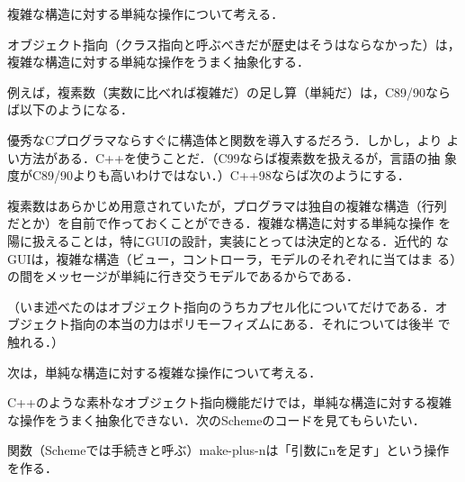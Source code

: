 \documentclass[a5paper,twoside,fleqn,draft]{jsbook}
\begin{document}

複雑な構造に対する単純な操作について考える．

オブジェクト指向（クラス指向と呼ぶべきだが歴史はそうはならなかった）は，
複雑な構造に対する単純な操作をうまく抽象化する．

例えば，複素数（実数に比べれば複雑だ）の足し算（単純だ）は，C89/90なら
ば以下のようになる．


優秀なCプログラマならすぐに構造体と関数を導入するだろう．しかし，より
よい方法がある．C++を使うことだ．（C99ならば複素数を扱えるが，言語の抽
  象度がC89/90よりも高いわけではない．）C++98ならば次のようにする．


複素数はあらかじめ用意されていたが，プログラマは独自の複雑な構造（行列
だとか）を自前で作っておくことができる．複雑な構造に対する単純な操作
を陽に扱えることは，特にGUIの設計，実装にとっては決定的となる．近代的
なGUIは，複雑な構造（ビュー，コントローラ，モデルのそれぞれに当てはま
る）の間をメッセージが単純に行き交うモデルであるからである．

（いま述べたのはオブジェクト指向のうちカプセル化についてだけである．オ
ブジェクト指向の本当の力はポリモーフィズムにある．それについては後半
で触れる．）

次は，単純な構造に対する複雑な操作について考える．

C++のような素朴なオブジェクト指向機能だけでは，単純な構造に対する複雑
な操作をうまく抽象化できない．次のSchemeのコードを見てもらいたい．


関数（Schemeでは手続きと呼ぶ）make-plus-nは「引数にnを足す」という操作
を作る．
\end{document}
